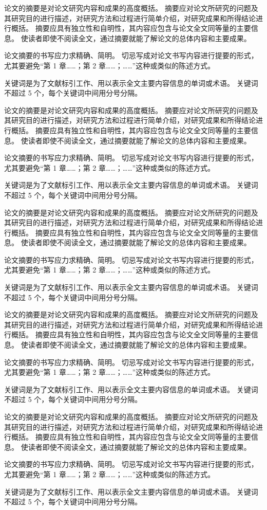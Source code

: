 
论文的摘要是对论文研究内容和成果的高度概括。
摘要应对论文所研究的问题及其研究目的进行描述，对研究方法和过程进行简单介绍，对研究成果和所得结论进行概括。
摘要应具有独立性和自明性，其内容应包含与论文全文同等量的主要信息。
使读者即使不阅读全文，通过摘要就能了解论文的总体内容和主要成果。

论文摘要的书写应力求精确、简明。
切忌写成对论文书写内容进行提要的形式，尤其要避免“第 1 章……；第 2 章……；……”这种或类似的陈述方式。

关键词是为了文献标引工作、用以表示全文主要内容信息的单词或术语。
关键词不超过 5 个，每个关键词中间用分号分隔。

论文的摘要是对论文研究内容和成果的高度概括。
摘要应对论文所研究的问题及其研究目的进行描述，对研究方法和过程进行简单介绍，对研究成果和所得结论进行概括。
摘要应具有独立性和自明性，其内容应包含与论文全文同等量的主要信息。
使读者即使不阅读全文，通过摘要就能了解论文的总体内容和主要成果。

论文摘要的书写应力求精确、简明。
切忌写成对论文书写内容进行提要的形式，尤其要避免“第 1 章……；第 2 章……；……”这种或类似的陈述方式。

关键词是为了文献标引工作、用以表示全文主要内容信息的单词或术语。
关键词不超过 5 个，每个关键词中间用分号分隔。

论文的摘要是对论文研究内容和成果的高度概括。
摘要应对论文所研究的问题及其研究目的进行描述，对研究方法和过程进行简单介绍，对研究成果和所得结论进行概括。
摘要应具有独立性和自明性，其内容应包含与论文全文同等量的主要信息。
使读者即使不阅读全文，通过摘要就能了解论文的总体内容和主要成果。

论文摘要的书写应力求精确、简明。
切忌写成对论文书写内容进行提要的形式，尤其要避免“第 1 章……；第 2 章……；……”这种或类似的陈述方式。

关键词是为了文献标引工作、用以表示全文主要内容信息的单词或术语。
关键词不超过 5 个，每个关键词中间用分号分隔。

论文的摘要是对论文研究内容和成果的高度概括。
摘要应对论文所研究的问题及其研究目的进行描述，对研究方法和过程进行简单介绍，对研究成果和所得结论进行概括。
摘要应具有独立性和自明性，其内容应包含与论文全文同等量的主要信息。
使读者即使不阅读全文，通过摘要就能了解论文的总体内容和主要成果。

论文摘要的书写应力求精确、简明。
切忌写成对论文书写内容进行提要的形式，尤其要避免“第 1 章……；第 2 章……；……”这种或类似的陈述方式。

关键词是为了文献标引工作、用以表示全文主要内容信息的单词或术语。
关键词不超过 5 个，每个关键词中间用分号分隔。

论文的摘要是对论文研究内容和成果的高度概括。
摘要应对论文所研究的问题及其研究目的进行描述，对研究方法和过程进行简单介绍，对研究成果和所得结论进行概括。
摘要应具有独立性和自明性，其内容应包含与论文全文同等量的主要信息。
使读者即使不阅读全文，通过摘要就能了解论文的总体内容和主要成果。

论文摘要的书写应力求精确、简明。
切忌写成对论文书写内容进行提要的形式，尤其要避免“第 1 章……；第 2 章……；……”这种或类似的陈述方式。

关键词是为了文献标引工作、用以表示全文主要内容信息的单词或术语。
关键词不超过 5 个，每个关键词中间用分号分隔。
